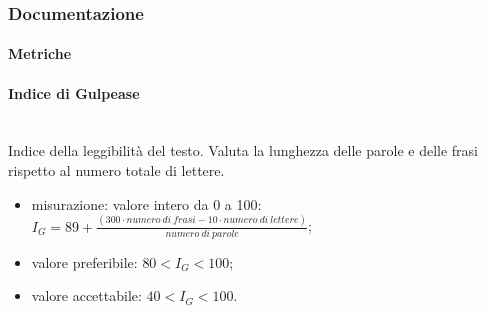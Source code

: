 	\subsubsection{Documentazione}
		\paragraph{Metriche}
			\paragraph*{Indice di Gulpease}\mbox{}\\
			Indice della leggibilità del testo. Valuta la lunghezza delle parole e delle frasi rispetto al numero totale di lettere. 
			\begin{itemize}
				\item misurazione: valore intero da 0 a 100:\newline 	
				$I_G = 89+ \frac{(300 \cdot numero\ di\ frasi - 10 \cdot numero\ di\ lettere)}{numero\ di\ parole}$;	
				\item valore preferibile: $80 < I_G < 100$;
				\item valore accettabile: $40 < I_G < 100$.
			\end{itemize}

	\begin{comment}		
	\subsection{Processi organizzativi}
	
	\subsubsection{Gestione della qualità}
		\paragraph{Metriche}
			\subparagraph{PMS: Percentuale di metriche soddisfatte}
			La percentuale di metriche soddisfatte valuta quante metriche raggiungono soglie accettabili sul numero totale delle metriche calcolate. Una bassa percentuale di soddisfazione può indicare poca qualità, metriche inadeguate o mancata correttezza nel calcolo.
			\begin{itemize}
				\item misurazione: $\frac{numero\ di\ metriche\ soddisfatte}{numero\ di\ metriche\ totali} $;
				\item valore preferibile: $ \geq 80\%$;
				\item valore accettabile: $ \geq 60\%$.
			\end{itemize}
	\end{comment}
